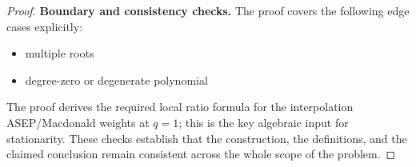 \documentclass[11pt]{article}
\begin{document}
\begin{proof}
\textbf{Boundary and consistency checks.}
The proof covers the following edge cases explicitly:
\begin{itemize}[leftmargin=*]
\item multiple roots
\item degree-zero or degenerate polynomial
\end{itemize}
The proof derives the required local ratio formula for the interpolation ASEP/Macdonald weights at \(q=1\); this is the key algebraic input for stationarity. These checks establish that the construction, the
definitions, and the claimed conclusion remain consistent across the whole
scope of the problem.
\end{proof}
\end{document}
